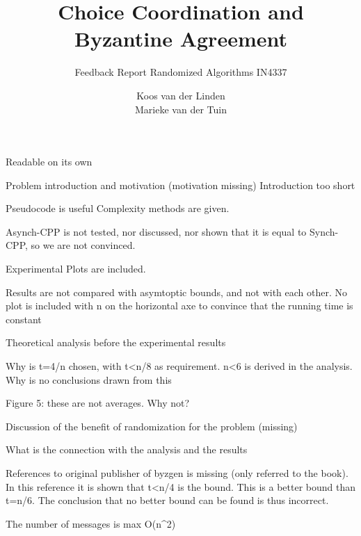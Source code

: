\documentclass[nocopyrightspace]{acm_proc_article-sp}
\begin{document}
\title{Choice Coordination and Byzantine Agreement}
\subtitle{Feedback Report Randomized Algorithms IN4337}
\author{
\alignauthor
Koos van der Linden \\ 
\alignauthor
Marieke van der Tuin \\ 
}
\maketitle

Readable on its own

Problem introduction and motivation (motivation missing)
Introduction too short

Pseudocode is useful
Complexity methods are given. 

Asynch-CPP is not tested, nor discussed, nor shown that it is equal to Synch-CPP, so we are not convinced.

Experimental Plots are included.

Results are not compared with asymtoptic bounds, and not with each other.
No plot is included with n on the horizontal axe to convince that the running time is constant

Theoretical analysis before the experimental results

Why is t=4/n chosen, with t<n/8 as requirement. n<6 is derived in the analysis. Why is no conclusions drawn from this

Figure 5: these are not averages. Why not?

Discussion of the benefit of randomization for the problem (missing)

What is the connection with the analysis and the results

References to original publisher of byzgen is missing (only referred to the book).
In this reference it is shown that t<n/4 is the bound. This is a better bound than t=n/6. The conclusion that no better bound can be found is thus incorrect.

The number of messages is max O(n^2)
\end{document}
